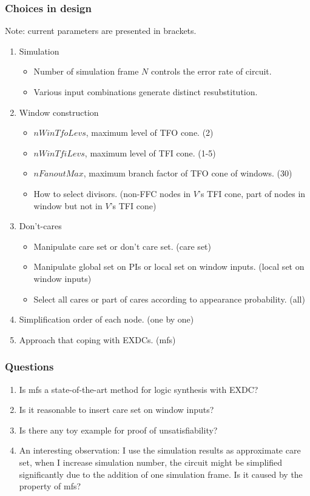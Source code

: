 \documentclass{rpt}
\begin{document}
\subsubsection*{Choices in design}
Note: current parameters are presented in brackets.
\begin{enumerate}
    \item Simulation
        \begin{itemize}
            \item Number of simulation frame $N$ controls the error rate of circuit.
            \item Various input combinations generate distinct resubstitution.
        \end{itemize}
    \item Window construction
        \begin{itemize}
            \item $nWinTfoLevs$, maximum level of TFO cone. (2)
            \item $nWinTfiLevs$, maximum level of TFI cone. (1-5)
            \item $nFanoutMax$, maximum branch factor of TFO cone of windows. (30)
            \item How to select divisors. (non-FFC nodes in $V$'s TFI cone, part of nodes in window but not in $V$'s TFI cone)
        \end{itemize}
    \item Don't-cares
        \begin{itemize}
            \item Manipulate care set or don't care set. (care set)
            \item Manipulate global set on PIs or local set on window inputs. (local set on window inputs)
            \item Select all cares or part of cares according to appearance probability. (all)
        \end{itemize}
    \item Simplification order of each node. (one by one)
    \item Approach that coping with EXDCs. (mfs)
\end{enumerate}

\subsubsection*{Questions}
\begin{enumerate}
    \item Is mfs a state-of-the-art method for logic synthesis with EXDC?
    \item Is it reasonable to insert care set on window inputs?
    \item Is there any toy example for proof of unsatisfiability?
    \item An interesting observation: I use the simulation results as approximate care set,
        when I increase simulation number,
        the circuit might be simplified significantly due to the addition of one simulation frame.
        Is it caused by the property of mfs?
\end{enumerate}
\end{document}
